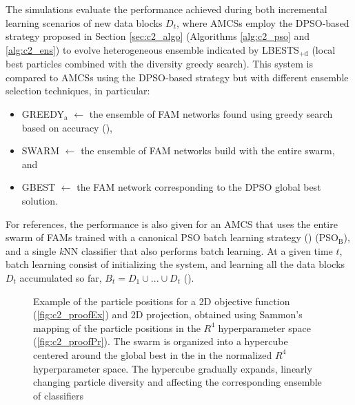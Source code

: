 The simulations evaluate the performance achieved during both incremental learning scenarios of new data blocks $D_t$, where AMCSs employ the DPSO-based strategy proposed in Section \ref{sec:c2_algo} (Algorithms \ref{alg:c2_pso} and \ref{alg:c2_ens}) to evolve heterogeneous ensemble indicated by LBESTS$_\text{+d}$ (local best particles combined with the diversity greedy search).
This system is compared to AMCSs using the DPSO-based strategy but with different ensemble selection techniques, in particular:
\begin{itemize}
	\item GREEDY$_\text{a}$ $\leftarrow$ the ensemble of FAM networks found using greedy search based on accuracy (\cite{ulas09}),
	\item SWARM $\leftarrow$ the ensemble of FAM networks build with the entire swarm, and 
	\item GBEST $\leftarrow$ the FAM network corresponding to the DPSO global best solution.
\end{itemize}
For references, the performance is also given for an AMCS that uses the entire swarm of FAMs trained with a canonical PSO batch learning strategy (\cite{granger07}) (PSO$_\text{B}$), and a single \textit{k}NN classifier that also performs batch learning.
At a given time $t$, batch learning consist of initializing the system, and learning all the data blocks $D_t$ accumulated so far, $B_t = D_1\cup...\cup D_t$ (\cite{granger07}).

\begin{figure*}[t]
  \centering
  \caption{Example of the particle positions for a 2D objective function (\ref{fig:c2_proofEx}) and 2D projection, obtained using Sammon's mapping of the particle positions in the $R^4$ hyperparameter space (\ref{fig:c2_proofPr}).
The swarm is organized into a hypercube centered around the global best in the in the normalized $R^4$ hyperparameter space.
The hypercube gradually expands, linearly changing particle diversity and affecting the corresponding ensemble of classifiers}
	\label{fig:c2_proof}
\end{figure*}

